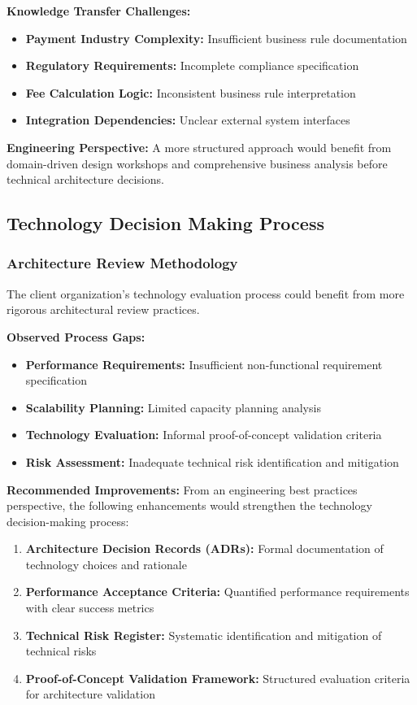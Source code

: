 \textbf{Knowledge Transfer Challenges:}
\begin{itemize}
    \item \textbf{Payment Industry Complexity:} Insufficient business rule documentation
    \item \textbf{Regulatory Requirements:} Incomplete compliance specification
    \item \textbf{Fee Calculation Logic:} Inconsistent business rule interpretation
    \item \textbf{Integration Dependencies:} Unclear external system interfaces
\end{itemize}

\textbf{Engineering Perspective:}
A more structured approach would benefit from domain-driven design workshops and comprehensive business analysis before technical architecture decisions.

\subsection{Technology Decision Making Process}

\subsubsection{Architecture Review Methodology}

The client organization's technology evaluation process could benefit from more rigorous architectural review practices.

\textbf{Observed Process Gaps:}
\begin{itemize}
    \item \textbf{Performance Requirements:} Insufficient non-functional requirement specification
    \item \textbf{Scalability Planning:} Limited capacity planning analysis
    \item \textbf{Technology Evaluation:} Informal proof-of-concept validation criteria
    \item \textbf{Risk Assessment:} Inadequate technical risk identification and mitigation
\end{itemize}

\textbf{Recommended Improvements:}
From an engineering best practices perspective, the following enhancements would strengthen the technology decision-making process:

\begin{enumerate}
    \item \textbf{Architecture Decision Records (ADRs):} Formal documentation of technology choices and rationale
    \item \textbf{Performance Acceptance Criteria:} Quantified performance requirements with clear success metrics
    \item \textbf{Technical Risk Register:} Systematic identification and mitigation of technical risks
    \item \textbf{Proof-of-Concept Validation Framework:} Structured evaluation criteria for architecture validation
\end{enumerate}

